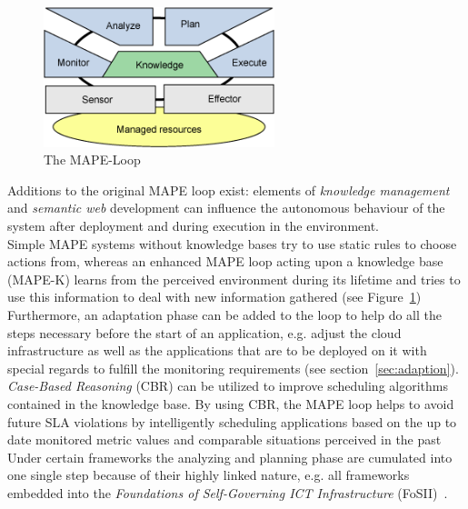 \documentclass[a4paper]{llncs}
\begin{document}
\begin{figure}[Ht]
	\centering
		\includegraphics[width=0.6\textwidth]{figs/mape.png}
	\caption{The MAPE-Loop}
	\label{fig:mape}
\end{figure}

Additions to the original MAPE loop exist: elements of \textit{knowledge management} and \textit{semantic web} development can influence the autonomous behaviour of the system after deployment and during execution in the environment.\\
Simple MAPE systems without knowledge bases try to use static rules to choose actions from, whereas an enhanced MAPE loop acting upon a knowledge base (MAPE-K) learns from the perceived environment during its lifetime and tries to use this information to deal with new information gathered (see Figure~\ref{fig:mape})\\
Furthermore, an adaptation phase can be added to the loop to help do all the steps necessary before the start of an application, e.g. adjust the cloud infrastructure as well as the applications that are to be deployed on it with special regards to fulfill the monitoring requirements (see section~\ref{sec:adaption})\cite{Maurer11}.\\
\textit{Case-Based Reasoning} (CBR) can be utilized to improve scheduling algorithms contained in the knowledge base. By using CBR, the MAPE loop helps to avoid future SLA violations by intelligently scheduling applications based on the up to date monitored metric values and comparable situations perceived in the past~\cite{Maurer10}\cite{Maurer11}\\
Under certain frameworks the analyzing and planning phase are cumulated into one single step  because of their highly linked nature, e.g. all frameworks embedded into the \textit{Foundations of Self-Governing ICT Infrastructure} (FoSII)~\cite{Maurer11}\cite{Emeakaroha10a}\cite{Emeakaroha10b}.
\end{document}
